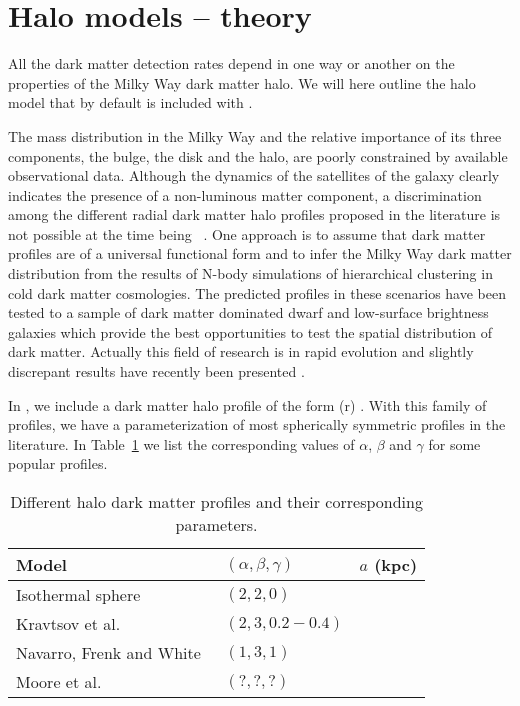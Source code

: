 \section{Halo models -- theory}
\label{sec:halo}

All the dark matter detection rates depend in one way or another on
the properties of the Milky Way dark matter halo. We will here outline
the halo model that by default is included with \ds.

The mass distribution in the Milky Way and the relative importance of
\mbox{its} three components, the bulge, the disk and the halo, are
poorly constrained by available observational data.  Although the
dynamics of the satellites of the galaxy clearly indicates the
presence of a non-luminous matter component, a discrimination among
the different radial dark matter halo profiles proposed in the
literature is not possible at the time being ~\cite{binney}.  One
approach is to assume that dark matter profiles are of a universal
functional form and to infer the Milky Way dark matter distribution
from the results of N-body simulations of hierarchical clustering in
cold dark matter cosmologies.  The predicted profiles in these
scenarios have been tested to a sample of dark matter dominated dwarf
and low-surface brightness galaxies which provide the best
opportunities to test the spatial distribution of dark matter.
Actually this field of research is in rapid evolution and slightly
discrepant results have recently been presented
\cite{navarro,carlberg,kravtsov,moore}.

In \ds, we include a dark matter halo profile of the form
\beq
   \rho(r) \propto {}.
\eeq
With this family of profiles, we have a parameterization of most
spherically symmetric profiles
in the literature. In Table~\ref{tab:halo-profile} we list the
corresponding values of $\alpha$, $\beta$ and $\gamma$ for some
popular profiles.

\begin{table}
\begin{center}
\begin{tabular}{lll}
{\bfseries Model} & {\bfseries $(\alpha,\beta,\gamma)$}
& {\bfseries $a$ (kpc)} \\ \hline
Isothermal sphere \cite{kravtsov} & $(2,2,0)$ \\
Kravtsov et al.\ \cite{kravtsov} & $(2,3,0.2-0.4)$ \\
Navarro, Frenk and White\ \cite{navarro} & $(1,3,1)$ \\
Moore et al.\ \cite{moore} & $(?,?,?)$ \\ \hline
\end{tabular}
\caption{Different halo dark matter profiles and their corresponding
parameters.} 
\label{tab:halo-profile}
\end{center}
\end{table}

